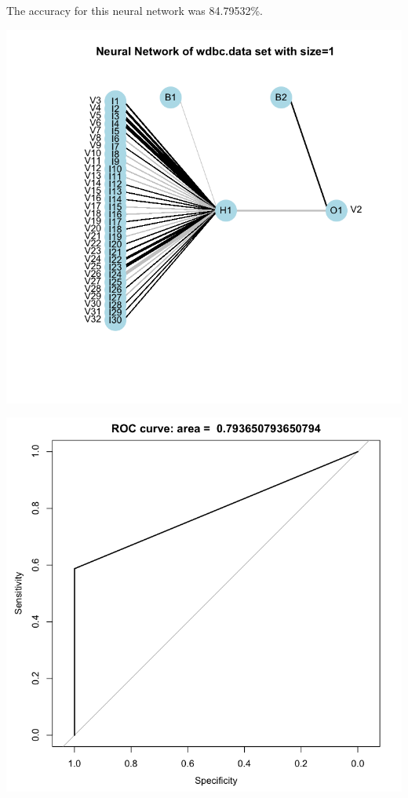 \documentclass[11pt]{article}
\begin{document}
\begin{enumerate}
\begin{enumerate}
The accuracy for this neural network was 84.79532\%.
\begin{center}
\includegraphics[scale=0.35]{nnet_1}
\end{center}
\begin{center}
\includegraphics[scale=0.35]{roc_curve_1}
\end{center}


\end{enumerate}
\end{enumerate}
\end{document}

